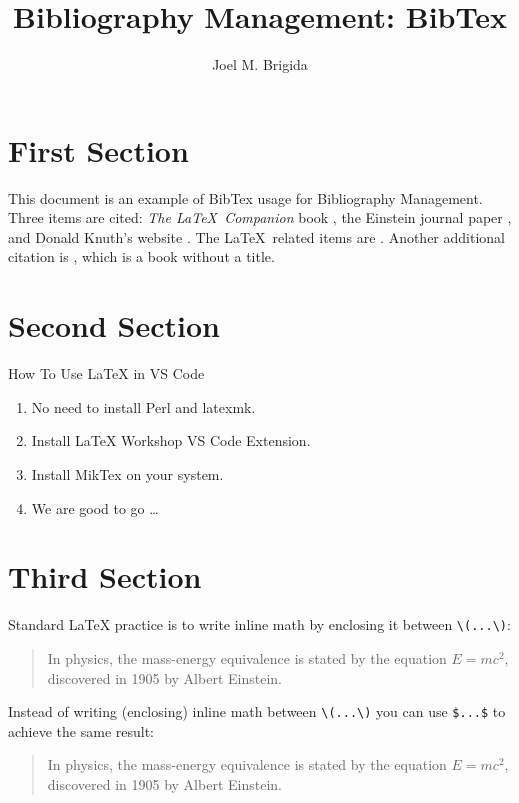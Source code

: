 \documentclass[letterpaper]{article} %
\title{Bibliography Management: BibTex}
\author{Joel M. Brigida}
\begin{document}
\maketitle

\pagebreak

\tableofcontents

\pagebreak

\section{First Section}
This document is an example of BibTex usage for Bibliography Management.
Three items are cited: \textit{The \LaTeX\ Companion} book \cite{latexcompanion},
the Einstein journal paper \cite{einstein}, and Donald Knuth's website \cite{knuthwebsite}.
The \LaTeX\ related items are \cite{latexcompanion,knuthwebsite}.
Another additional citation is \cite{dummy}, which is a book without a title.

\medskip

\section{Second Section}
How To Use LaTeX in VS Code
\begin{enumerate}
    \item No need to install Perl and latexmk.
    \item Install LaTeX Workshop VS Code Extension.
    \item Install MikTex on your system.
    \item We are good to go \dots
\end{enumerate}

\section{Third Section}

\noindent Standard \LaTeX{} practice is to write inline math by enclosing it between \verb|\(...\)|:

\begin{quote}
In physics, the mass-energy equivalence is stated 
by the equation \(E=mc^2\), discovered in 1905 by Albert Einstein.
\end{quote}

\noindent Instead of writing (enclosing) inline math between \verb|\(...\)| you can use \texttt{\$...\$} to achieve the same result:

\begin{quote}
In physics, the mass-energy equivalence is stated 
by the equation $E=mc^2$, discovered in 1905 by Albert Einstein.
\end{quote}
\end{document}
